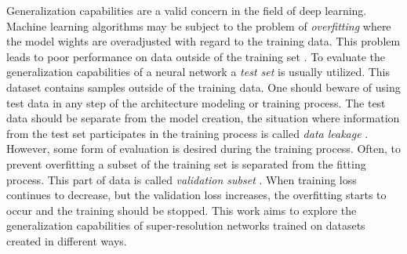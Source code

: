 Generalization capabilities are a valid concern in the field of deep learning.
Machine learning algorithms may be subject to the problem of \textit{overfitting} where the model wights are overadjusted with regard to the training data.
This problem leads to poor performance on data outside of the training set \cite{goodfellow-2016-deeplearning}.
To evaluate the generalization capabilities of a neural network a \textit{test set} is usually utilized.
This dataset contains samples outside of the training data.
One should beware of using test data in any step of the architecture modeling or training process.
The test data should be separate from the model creation, the situation where information from the test set participates in the training process is called \textit{data leakage} \cite{wagh-2018-leakage}.
However, some form of evaluation is desired during the training process.
Often, to prevent overfitting a subset of the training set is separated from the fitting process.
This part of data is called \textit{validation subset} \cite{geron-2019-ml}.
When training loss continues to decrease, but the validation loss increases, the overfitting starts to occur and the training should be stopped.
This work aims to explore the generalization capabilities of super-resolution networks trained on datasets created in different ways.


